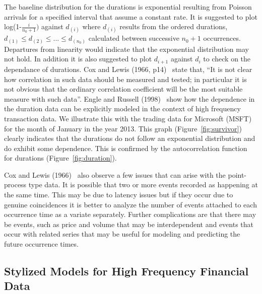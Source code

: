  The baseline distribution for the durations is exponential resulting from Poisson arrivals for a specified interval that assume a constant rate. It is suggested to plot log(1-$\frac{i}{n_0+1})$ against $d_{(i)}$ where $d_{(i)}$ results from the ordered durations, $d_{(1)} \leq d_{(2)} \leq ... \leq d_{(n_0)}$ calculated between successive $n_0+1$ occurrences. Departures from linearity would indicate that the exponential distribution may not hold. In addition it is also suggested to plot $d_{i+1}$ against $d_i$ to check on the dependance of durations. Cox and Lewis (1966, p14)~\cite{cox1966} state that, ``It is not clear how correlation in such data should be measured and tested; in particular it is not obvious that the ordinary correlation coefficient will be the most suitable measure with such data''. Engle and Russell (1998)~\cite{engle1998} show how the dependence in the duration data can be explicitly modeled in the context of high frequency transaction data. We illustrate this with the trading data for Microsoft (MSFT) for the month of January in the year 2013. This graph (Figure~\ref{fig:survivor}) clearly indicates that the durations do not follow an exponential distribution and do exhibit some dependence. This is confirmed by the autocorrelation function for durations (Figure~\ref{fig:duration}).


Cox and Lewis (1966)~\cite{cox1966} also observe a few issues that can arise with the point-process type data. It is possible that two or more events recorded as happening at the same time. This may be due to latency issues but if they occur due to genuine coincidences it is better to analyze the number of events attached to each occurrence time as a variate separately. Further complications are that there may be events, such as price and volume that may be interdependent and events that occur with related series that may be useful for modeling and predicting the future occurrence times.


\subsection{Stylized Models for High Frequency Financial Data}


